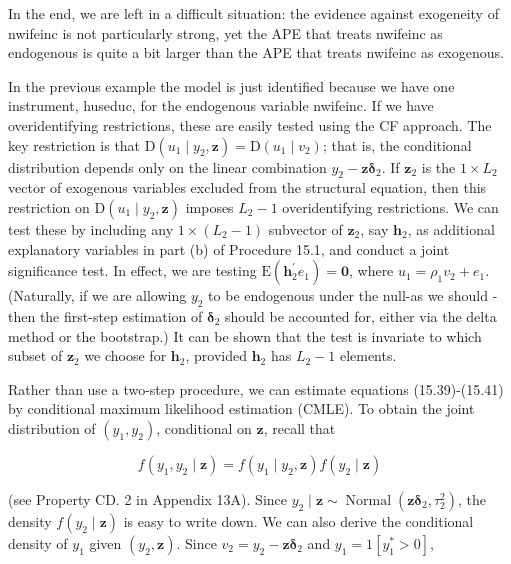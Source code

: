 \documentclass[10pt]{article}
\begin{document}
In the end, we are left in a difficult situation: the evidence against exogeneity of nwifeinc is not particularly strong, yet the APE that treats nwifeinc as endogenous is quite a bit larger than the APE that treats nwifeinc as exogenous.

In the previous example the model is just identified because we have one instrument, huseduc, for the endogenous variable nwifeinc. If we have overidentifying restrictions, these are easily tested using the CF approach. The key restriction is that $\mathrm{D}\left(u_{1} \mid y_{2}, \mathbf{z}\right)=\mathrm{D}\left(u_{1} \mid v_{2}\right)$; that is, the conditional distribution depends only on the linear combination $y_{2}-\mathbf{z} \boldsymbol{\delta}_{2}$. If $\mathbf{z}_{2}$ is the $1 \times L_{2}$ vector of exogenous variables excluded from the structural equation, then this restriction on $\mathrm{D}\left(u_{1} \mid y_{2}, \mathbf{z}\right)$ imposes $L_{2}-1$ overidentifying restrictions. We can test these by including any $1 \times\left(L_{2}-1\right)$ subvector of $\mathbf{z}_{2}$, say $\mathbf{h}_{2}$, as additional explanatory variables in part (b) of Procedure 15.1, and conduct a joint significance test. In effect, we are testing $\mathrm{E}\left(\mathbf{h}_{2}^{\prime} e_{1}\right)=\mathbf{0}$, where $u_{1}=\rho_{1} v_{2}+e_{1}$. (Naturally, if we are allowing $y_{2}$ to be endogenous under the null-as we should - then the first-step estimation of $\boldsymbol{\delta}_{2}$ should be accounted for, either via the delta method or the bootstrap.) It can be shown that the test is invariate to which subset of $\mathbf{z}_{2}$ we choose for $\mathbf{h}_{2}$, provided $\mathbf{h}_{2}$ has $L_{2}-1$ elements.

Rather than use a two-step procedure, we can estimate equations (15.39)-(15.41) by conditional maximum likelihood estimation (CMLE). To obtain the joint distribution of $\left(y_{1}, y_{2}\right)$, conditional on $\mathbf{z}$, recall that


\begin{equation*}
f\left(y_{1}, y_{2} \mid \mathbf{z}\right)=f\left(y_{1} \mid y_{2}, \mathbf{z}\right) f\left(y_{2} \mid \mathbf{z}\right) \tag{15.48}
\end{equation*}


(see Property CD. 2 in Appendix 13A). Since $y_{2} \mid \mathbf{z} \sim \operatorname{Normal}\left(\mathbf{z} \boldsymbol{\delta}_{2}, \tau_{2}^{2}\right)$, the density $f\left(y_{2} \mid \mathbf{z}\right)$ is easy to write down. We can also derive the conditional density of $y_{1}$ given $\left(y_{2}, \mathbf{z}\right)$. Since $v_{2}=y_{2}-\mathbf{z} \boldsymbol{\delta}_{2}$ and $y_{1}=1\left[y_{1}^{*}>0\right]$,
\end{document}
